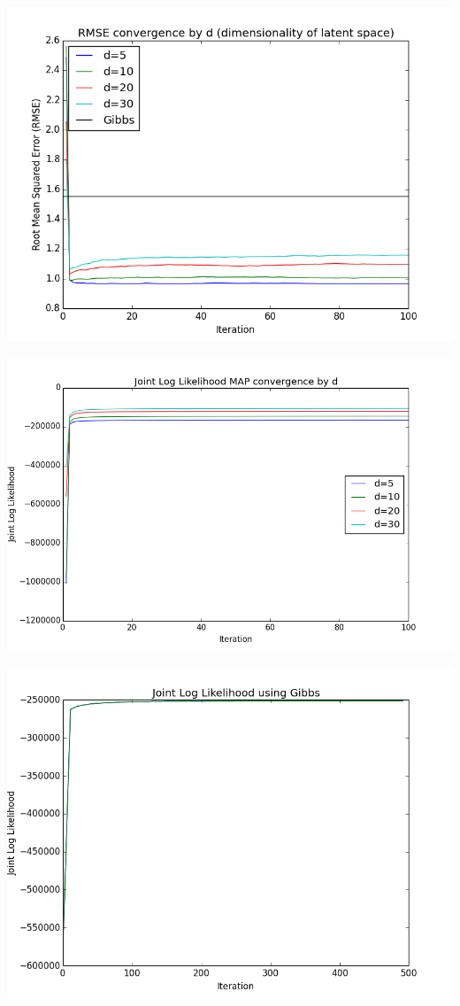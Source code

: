\documentclass{article}
\begin{document}
\begin{center}
\includegraphics[scale=0.75]{RMSE.png}
\end{center}

\noindent
\begin{center}
\includegraphics[scale=0.65]{LogJLL.png}\\
\end{center}

\noindent
\begin{center}
\includegraphics[scale=0.75]{JLL_Gibbs.png}\\
\end{center}
\end{document}
